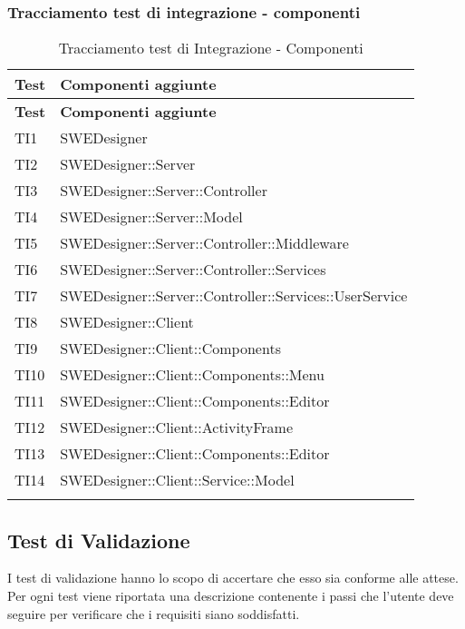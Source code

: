 \subsubsection{Tracciamento test di integrazione - componenti}
\begin{longtable}{p{2cm}!{\VRule[1pt]}p{10cm}}
\color{white} \textbf{Test} & \color{white} \textbf{Componenti aggiunte} \\ 
\endfirsthead 
{} 
\color{white} \textbf{Test} & \color{white} \textbf{Componenti aggiunte} \\ 
\endhead 
TI1 & SWEDesigner \\

TI2 & SWEDesigner::Server\\

TI3 & SWEDesigner::Server::Controller\\

TI4 & SWEDesigner::Server::Model \\

TI5 & SWEDesigner::Server::Controller::Middleware \\

TI6 & SWEDesigner::Server::Controller::Services \\

TI7 & SWEDesigner::Server::Controller::Services::UserService\\

TI8 & SWEDesigner::Client\\

TI9 & SWEDesigner::Client::Components\\

TI10 & SWEDesigner::Client::Components::Menu \\

TI11 & SWEDesigner::Client::Components::Editor \\

TI12 & SWEDesigner::Client::ActivityFrame\\

TI13 & SWEDesigner::Client::Components::Editor\\

TI14 & SWEDesigner::Client::Service::Model\\

\caption{Tracciamento test di Integrazione - Componenti}
\end{longtable}



\newpage
\subsection{Test di Validazione}
I test di validazione hanno lo scopo di accertare che esso sia conforme alle attese. Per ogni test viene riportata una descrizione contenente i passi che l’utente deve seguire per verificare che i requisiti siano soddisfatti.

